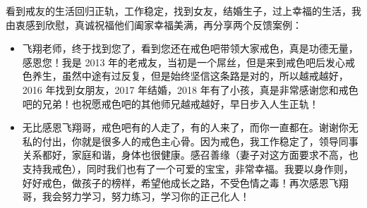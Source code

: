 \begin{case}
    看到戒友的生活回归正轨，工作稳定，找到女友，结婚生子，过上幸福的生活，我由衷感到欣慰，真诚祝福他们阖家幸福美满，再分享两个反馈案例：\begin{itemize}
        \item 飞翔老师，终于找到您了，看到您还在戒色吧带领大家戒色，真是功德无量，感恩您！我是 2013 年的老戒友，当初是一个屌丝，但是来到戒色吧后发心戒色养生，虽然中途有过反复，但是始终坚信这条路是对的，所以越戒越好，2016 年找到女朋友，2017 年结婚，2018 年有了小孩，真是非常感谢您和戒色吧的兄弟！也祝愿戒色吧的其他师兄越戒越好，早日步入人生正轨！
        \item 无比感恩飞翔哥，戒色吧有的人走了，有的人来了，而你一直都在。谢谢你无私的付出，你就是很多人的戒色主心骨。因为戒色，我工作稳定了，领导同事关系都好，家庭和谐，身体也很健康。感召善缘（妻子对这方面要求不高，也支持我戒色），同时我们也有了一个可爱的宝宝，非常幸福。我要以身作则，好好戒色，做孩子的榜样，希望他成长之路，不受色情之毒！再次感恩飞翔哥，我会努力学习，努力练习，学习你的正己化人！
    \end{itemize}
\end{case}

